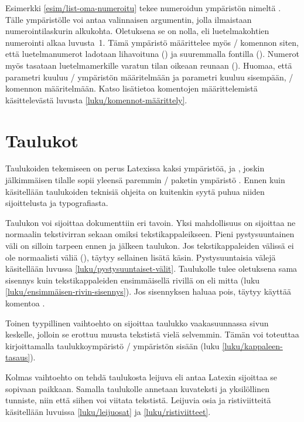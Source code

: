 Esimerkki \ref{esim/list-oma-numeroitu} tekee numeroidun ympäristön
nimeltä . Tälle ympäristölle voi antaa valinnaisen
argumentin, jolla ilmaistaan numerointilaskurin alkukohta. Oletuksena se
on nolla, eli luetelmakohtien numerointi alkaa luvusta~1. Tämä ympäristö
määrittelee myös \-/ komennon siten, että
luetelmanumerot ladotaan lihavoituna () ja suuremmalla
fontilla (). Numerot myös tasataan luetelmamerkille
varatun tilan oikeaan reunaan (). Huomaa, että parametri
 kuuluu \-/ ympäristön määritelmään ja
parametri  kuuluu sisempään, \-/
komennon määritelmään. Katso lisätietoa komentojen määrittelemistä
käsittelevästä luvusta \ref{luku/komennot-määrittely}.

\section{Taulukot}
\label{luku/taulukot}

Taulukoiden tekemiseen on perus Latexissa kaksi ympäristöä,
 ja , joskin jälkimmäisen tilalle
sopii yleensä paremmin \-/ paketin ympäristö
. Ennen kuin käsitellään taulukoiden teknisiä
ohjeita on kuitenkin syytä puhua niiden sijoittelusta ja typografiasta.

Taulukon voi sijoittaa dokumenttiin eri tavoin. Yksi mahdollisuus on
sijoittaa ne normaalin tekstivirran sekaan omiksi tekstikappaleikseen.
Pieni pystysuuntainen väli on silloin tarpeen ennen ja jälkeen taulukon.
Jos tekstikappaleiden välissä ei ole normaalisti väliä
(), täytyy sellainen lisätä käsin. Pystysuuntaisia välejä
käsitellään luvussa \ref{luku/pystysuuntaiset-välit}. Taulukolle tulee
oletuksena sama sisennys kuin tekstikappaleiden ensimmäisellä rivillä on
eli mitta  (luku
\ref{luku/ensimmäisen-rivin-sisennys}). Jos sisennyksen haluaa pois,
täytyy käyttää komentoa .

Toinen tyypillinen vaihtoehto on sijoittaa taulukko vaakasuunnassa sivun
keskelle, jolloin se erottuu muusta tekstistä vielä selvemmin. Tämän voi
toteuttaa kirjoittamalla taulukkoympäristö \-/
ympäristön sisään (luku \ref{luku/kappaleen-tasaus}).

Kolmas vaihtoehto on tehdä taulukosta leijuva eli antaa Latexin
sijoittaa se sopivaan paikkaan. Samalla taulukolle annetaan kuvateksti
ja yksilöllinen tunniste, niin että siihen voi viitata tekstistä.
Leijuvia osia ja ristiviitteitä käsitellään luvuissa
\ref{luku/leijuosat} ja \ref{luku/ristiviitteet}.

